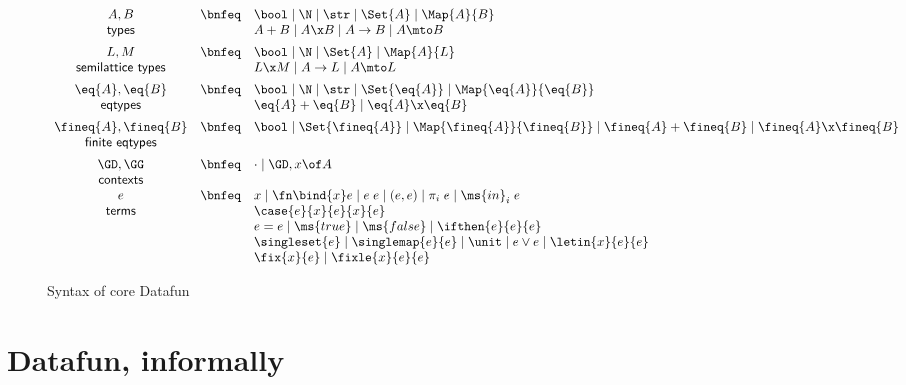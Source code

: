 \documentclass[preprint]{sigplanconf}
\renewcommand{\pipe}{\mathrel{\mid}} %
\newcommand{\uto}{\to}
\begin{document}

\begin{figure}
  \[\begin{array}{ccl}
    A, B     &\bnfeq& \bool \pipe \N \pipe \str \pipe \Set{A}
                      \pipe \Map{A}{B}
    \\
    \textsf{types} && A + B \pipe A \x B \pipe A \uto B \pipe A \mto B
    \vspace{0.5em}\\
    L, M         &\bnfeq& \bool \pipe \N \pipe \Set{A} \pipe \Map{A}{L}
    \\
    \textsf{semilattice types} && L \x M \pipe A \uto L \pipe A \mto L
    \vspace{0.5em}\\
    \eq{A}, \eq{B} &\bnfeq& \bool \pipe \N \pipe \str \pipe \Set{\eq{A}}
                            \pipe \Map{\eq{A}}{\eq{B}}
    \\
    \textsf{eqtypes} && \eq{A} + \eq{B} \pipe \eq{A} \x \eq{B}
    \vspace{0.5em}\\
    \fineq{A},\fineq{B}
    &\bnfeq& \bool \pipe \Set{\fineq{A}}
       \pipe \Map{\fineq{A}}{\fineq{B}}
       \pipe \fineq{A} + \fineq{B} \pipe \fineq{A} \x \fineq{B}\\
    \textsf{finite eqtypes}
    \vspace{0.5em}\\
    \GD,\GG &\bnfeq& \cdot \pipe \GD, x\of A\\
    \textsf{contexts}\\
    e &\bnfeq& x \pipe \fn\bind{x} e \pipe e\;e
    \pipe (e,e) \pipe \pi_i\;e \pipe \ms{in}_i\;e\\
    \textsf{terms}
    && \case{e}{x}{e}{x}{e}\\
    && e = e \pipe \ms{true} \pipe \ms{false} \pipe \ifthen{e}{e}{e}\\
    && \singleset{e} \pipe \singlemap{e}{e}
       \pipe \unit \pipe e \vee e \pipe \letin{x}{e}{e}\\
    && \fix{x}{e} \pipe \fixle{x}{e}{e}
  \end{array}\]
  \caption{Syntax of core Datafun}
  \label{fig:syntax}
\end{figure}


\section{Datafun, informally}
\end{document}
